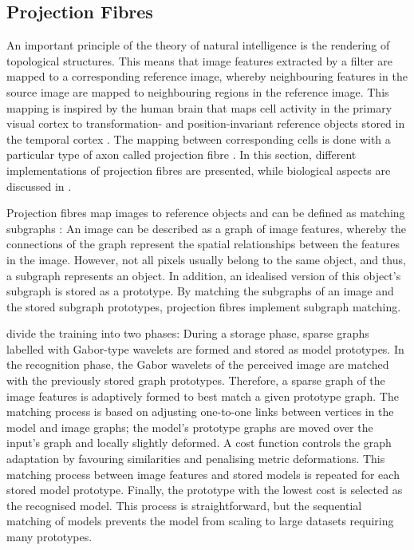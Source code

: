 \subsection{Projection Fibres}
An important principle of the theory of natural intelligence is the rendering of topological structures.
This means that image features extracted by a filter are mapped to a corresponding reference image, whereby neighbouring features in the source image are mapped to neighbouring regions in the reference image.
This mapping is inspired by the human brain that maps cell activity in the primary visual cortex  to transformation- and position-invariant reference objects stored in the 
temporal cortex .
The mapping between corresponding cells is done with a particular type of axon called projection fibre .
In this section, different implementations of projection fibres are presented, while biological aspects are discussed in . 

Projection fibres map images to reference objects and can be defined as matching subgraphs \cite{bienenstock_neural_1987, lades_distortion_1993, wiskott_face_1996}:
An image can be described as a graph of image features, whereby the connections of the graph represent the spatial relationships between the features in the image. However, not all pixels usually belong to the same object, and thus, a subgraph represents an object.
In addition, an idealised version of this object's subgraph is stored as a prototype.
By matching the subgraphs of an image and the stored subgraph prototypes, projection fibres implement subgraph matching.

 divide the training into two phases: During a storage phase, sparse graphs labelled with Gabor-type wavelets are formed and stored as model prototypes. In the recognition phase, the Gabor wavelets of the perceived image are matched with the previously stored graph prototypes.
Therefore, a sparse graph of the image features is adaptively formed to best match a given prototype graph. The matching process is based on adjusting one-to-one links between vertices in the model and image graphs; the model's prototype graphs are moved over the input's graph and locally slightly deformed. A cost function controls the graph adaptation by favouring similarities and penalising metric deformations. This matching process between image features and stored models is repeated for each stored model prototype. Finally, the prototype with the lowest cost is selected as the recognised model. This process is straightforward, but the sequential matching of models prevents the model from scaling to large datasets requiring many prototypes.

